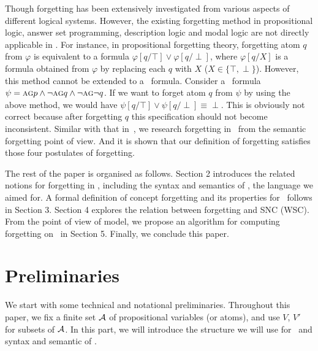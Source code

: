 \documentclass{article}
\begin{document}
Though forgetting has been extensively investigated from various aspects of different logical systems.
However, the existing forgetting method in propositional
logic, answer set programming, description logic and modal logic are not directly applicable in \CTL.
For instance, in propositional forgetting theory, forgetting atom $q$ from $\varphi$ is equivalent to a formula $\varphi[q/\top] \vee \varphi[q/\perp]$, where $\varphi[q/X]$ is a formula obtained from $\varphi$ by replacing each $q$ with $X$ ($X\in \{\top, \perp\}$).
However, this method cannot be extended to a \CTL\ formula. Consider a \CTL\ formula $\psi=\textsc{a}\textsc{g} p \wedge \neg \textsc{a}\textsc{g} q \wedge \neg \textsc{a}\textsc{g} \neg q$. If we want to forget
atom $q$ from $\psi$ by using the above method, we would have $\psi[q/\top] \vee \psi[q/\perp] \equiv \perp$. This is obviously not correct because after forgetting $q$ this specification should
not become inconsistent.
Similar with that in~\cite{Yan:AIJ:2009}, we research forgetting in \CTL\ from the semantic forgetting point of view.
And it is shown that our definition of forgetting satisfies those four postulates of forgetting.

The rest of the paper is organised as follows. Section 2 introduces the related notions for forgetting in \CTL, including the syntax and semantics of \CTL, the language we aimed for.
A formal definition of concept forgetting and its properties for \CTL\ follows in Section 3.
Section 4 explores the relation between forgetting and SNC (WSC).
From the point of view of model, we propose an algorithm for computing forgetting on \CTL\ in Section 5.
Finally, we conclude this paper.



 \section{Preliminaries}
 We start with some technical and notational preliminaries. Throughout this paper, we fix a finite set ${\cal A}$ of propositional variables (or atoms), and use $V$, $V'$ for subsets of ${\cal A}$. In this part, we will introduce the structure we will use for \CTL\ and syntax and semantic of \CTL.
\end{document}
